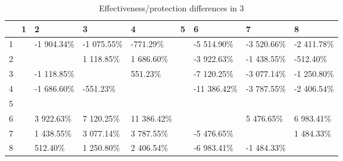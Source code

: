 \begin{table}[ht]
\centering
\begin{tabular}{rllllllll}
  \hline
 & 1 & 2 & 3 & 4 & 5 & 6 & 7 & 8 \\ 
  \hline
1 &  & -1 904.34\% & -1 075.55\% & -771.29\% &  & -5 514.90\% & -3 520.66\% & -2 411.78\% \\ 
  2 &  &  & 1 118.85\% & 1 686.60\% &  & -3 922.63\% & -1 438.55\% & -512.40\% \\ 
  3 &  & -1 118.85\% &  & 551.23\% &  & -7 120.25\% & -3 077.14\% & -1 250.80\% \\ 
  4 &  & -1 686.60\% & -551.23\% &  &  & -11 386.42\% & -3 787.55\% & -2 406.54\% \\ 
  5 &  &  &  &  &  &  &  &  \\ 
  6 &  & 3 922.63\% & 7 120.25\% & 11 386.42\% &  &  & 5 476.65\% & 6 983.41\% \\ 
  7 &  & 1 438.55\% & 3 077.14\% & 3 787.55\% &  & -5 476.65\% &  & 1 484.33\% \\ 
  8 &  & 512.40\% & 1 250.80\% & 2 406.54\% &  & -6 983.41\% & -1 484.33\% &  \\ 
   \hline
\end{tabular}
\caption{Effectiveness/protection differences in  3} 
\end{table}

